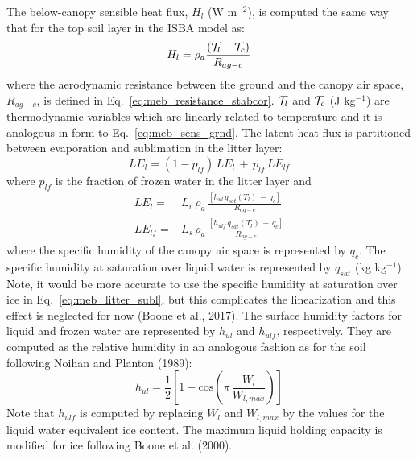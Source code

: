 {The below-canopy sensible heat flux, $H_l$ (W m$^{-2}$), is computed
the same way that for the top soil layer in the ISBA model as:
%
\begin{equation}
H_l = \rho_a \frac{\left({\cal T}_l -{\cal T}_c\right)}{R_{ag-c}}
\end{equation}
%
where the aerodynamic resistance between the ground and
the canopy air space,  $R_{ag-c}$, is defined in Eq.~\ref{eq:meb_resistance_stabcor}. 
${\cal T}_l$ and ${\cal T}_c$ (J kg$^{-1}$) are thermodynamic
variables which are linearly related to temperature
and it is analogous in form to Eq.~\ref{eq:meb_sens_grnd}.
%
The latent heat flux is partitioned between evaporation and
sublimation 
in the litter layer:
%
\begin{equation}
 LE_l = \left(1-p_{lf}\right)\,LE_{l} \,+\, p_{lf}\,LE_{lf}
\end{equation}
%
where $p_{lf}$ is the fraction of frozen water in the litter layer and
%
\begin{subequations}\label{eq:meb_lw_g_n_terms}
\begin{align}
\label{eq:meb_litter_evap}
 LE_{l} =& L_v\,\rho_a\,\frac{\left[h_{ul}\,q_{sat}\left(T_l\right) \,-\,
     q_c\right]}{R_{ag-c}}
\\
\label{eq:meb_litter_subl}
 LE_{lf} = & L_s\,\rho_a\,\frac{\left[h_{ulf}\,q_{sat}\left(T_l\right)
     \,-\, q_c\right]}{R_{ag-c}}
\end{align}
\end{subequations}
%
where the specific humidity of the canopy air space is
represented by $q_c$.
The specific humidity at saturation over liquid
water is represented by $q_{sat}$ (kg kg$^{-1}$). 
Note, it would be more accurate to use the specific humidity at
saturation over ice in Eq.~\ref{eq:meb_litter_subl}, but this complicates the
linearization and this effect is neglected for now 
(Boone et al., 2017)\nocite{boone_ea_2017}.
%
The surface humidity
factors for liquid and frozen water are represented by
$h_{ul}$ and $h_{ulf}$, respectively. They are computed as
the relative humidity in an analogous fashion as for the soil
following 
Noihan and Planton (1989)\nocite{Noilhan1989}:
%
\begin{equation}
 h_{ul}=\frac{1}{2}\left[1-\mathrm{cos}\left(\pi \, \frac{W_{l}}{W_{l,max}}\right)\right]
\end{equation}
%
Note that $h_{ulf}$ is computed by replacing $W_{l}$ and $W_{l,max}$
by the values for the liquid water equivalent ice content.
The maximum liquid holding capacity is modified for ice following
Boone et al. (2000)\nocite{Boone2000}.

}
